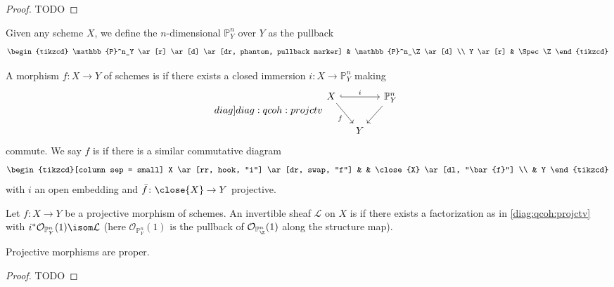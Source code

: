 \documentclass[wip, algebra]{bsteffan-lecturenotes}
\newcommand{\cO}{\mathcal{O}}
\newcommand{\cL}{\mathcal{L}}
\renewcommand{\P}{\mathbb{P}}
\begin{document}
\begin{proof}
	TODO
\end{proof}
Given any scheme $X$, we define the $n$-dimensional  $\P^n_Y$ over $Y$ as the pullback
\begin{equation*}
	\begin{tikzcd}
		\P^n_Y
				\ar[r]
				\ar[d]
				\ar[dr, phantom, pullback marker]
			& \P^n_\Z
				\ar[d]
		\\
		Y 
				\ar[r]
			& \Spec \Z
	\end{tikzcd}
\end{equation*}
\begin{definition}
	A morphism $f\colon X \to Y$ of schemes is  if there exists a closed immersion $i\colon X \to \P^n_Y$ making 
	\begin{equation}\label[diag]{diag:qcoh:projctv}
		\begin{tikzcd}[column sep = small]
			X
					\ar[rr, hook, "i"]
					\ar[dr, swap, "f"]
				& & \P^n_Y
					\ar[dl]
			\\
				& Y
		\end{tikzcd}
	\end{equation}
	commute.
	We say $f$ is  if there is a similar commutative diagram
	\begin{equation*}
		\begin{tikzcd}[column sep = small]
			X
					\ar[rr, hook, "i"]
					\ar[dr, swap, "f"]
				& & \close{X}
					\ar[dl, "\bar{f}"]
			\\
				& Y
		\end{tikzcd}
	\end{equation*}
	with $i$ an open embedding and $\bar{f}\colon \close{X} \to Y$ projective.
\end{definition}
\begin{definition}
	Let $f\colon X \to Y$ be a projective morphism of schemes. 
	An invertible sheaf $\cL$ on $X$ is  if there exists a factorization as in \cref{diag:qcoh:projctv} with $i^* \cO_{\P^n_Y}(1) \isom \cL$ (here $\cO_{\P^n_Y}(1)$ is the pullback of $\cO_{\P^n_\Z}(1)$ along the structure map).
\end{definition}
\begin{proposition}
	Projective morphisms are proper.
\end{proposition}
\begin{proof}
	TODO
\end{proof}
\end{document}
